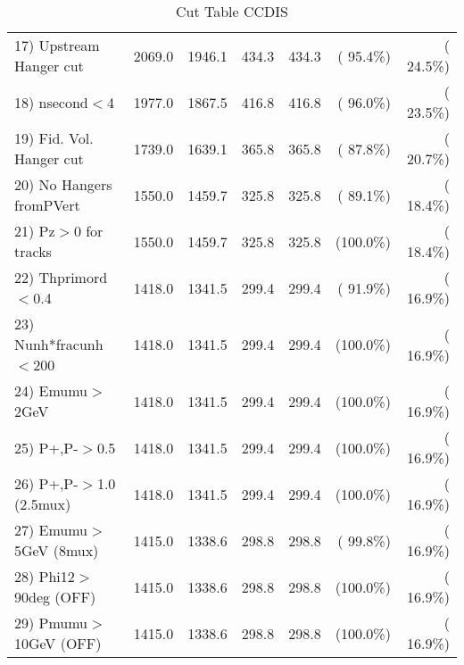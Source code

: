 \begin{table}[h!]
\begin{tabular}{||l||r|r|r|r|r|r||}
 17) Upstream Hanger cut  &       2069.0 &       1946.1 &        434.3 &        434.3 & ( 95.4\%) & ( 24.5\%) \\
 18) nsecond$<$4          &       1977.0 &       1867.5 &        416.8 &        416.8 & ( 96.0\%) & ( 23.5\%) \\
 19) Fid. Vol. Hanger cut &       1739.0 &       1639.1 &        365.8 &        365.8 & ( 87.8\%) & ( 20.7\%) \\
 20) No Hangers fromPVert &       1550.0 &       1459.7 &        325.8 &        325.8 & ( 89.1\%) & ( 18.4\%) \\
 21) Pz$>$0 for tracks    &       1550.0 &       1459.7 &        325.8 &        325.8 & (100.0\%) & ( 18.4\%) \\
 22) Thprimord$<$0.4      &       1418.0 &       1341.5 &        299.4 &        299.4 & ( 91.9\%) & ( 16.9\%) \\
 23) Nunh*fracunh$<$200   &       1418.0 &       1341.5 &        299.4 &        299.4 & (100.0\%) & ( 16.9\%) \\
 24) Emumu$>$2GeV         &       1418.0 &       1341.5 &        299.4 &        299.4 & (100.0\%) & ( 16.9\%) \\
 25) P+,P-$>$0.5          &       1418.0 &       1341.5 &        299.4 &        299.4 & (100.0\%) & ( 16.9\%) \\
 26) P+,P-$>$1.0 (2.5mux) &       1418.0 &       1341.5 &        299.4 &        299.4 & (100.0\%) & ( 16.9\%) \\
 27) Emumu$>$5GeV  (8mux) &       1415.0 &       1338.6 &        298.8 &        298.8 & ( 99.8\%) & ( 16.9\%) \\
 28) Phi12$>$90deg  (OFF) &       1415.0 &       1338.6 &        298.8 &        298.8 & (100.0\%) & ( 16.9\%) \\
 29) Pmumu$>$10GeV  (OFF) &       1415.0 &       1338.6 &        298.8 &        298.8 & (100.0\%) & ( 16.9\%) \\
 \hline
 \hline
 \end{tabular}
 \caption{Cut Table  CCDIS    }
 \label{tab-cutcohjpsi-mumu_ncdis}
 \end{table}
